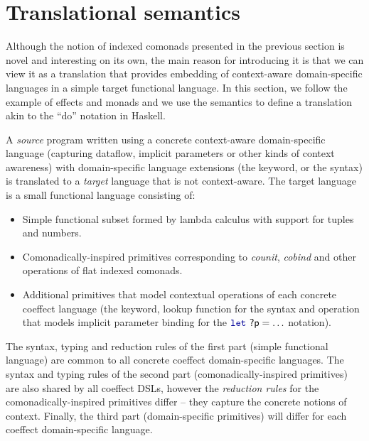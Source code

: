 
\section{Translational semantics}
\label{sec:semantics-translation}

Although the notion of indexed comonads presented in the previous section is novel and interesting
on its own, the main reason for introducing it is that we can view it as a translation that provides
embedding of context-aware domain-specific languages in a simple target functional language.
In this section, we follow the example of effects and monads and we use the semantics to define a
translation akin to the ``do'' notation in Haskell.

A \emph{source} program written using a concrete context-aware domain-specific
language (capturing dataflow, implicit parameters or other kinds of context awareness) with
domain-specific language extensions (the  keyword, or the  syntax)
is translated to a \emph{target} language that is not context-aware. The target language is
a small functional language consisting of:

\begin{itemize}
  \item Simple functional subset formed by lambda calculus with support for tuples and numbers.
  \item Comonadically-inspired primitives corresponding to \emph{counit}, \emph{cobind} and
    other operations of flat indexed comonads.
  \item Additional primitives that model contextual operations of each concrete coeffect language
    (the  keyword, lookup function for the  syntax and operation that models
     implicit parameter binding for the $\kvd{let}~\ident{?p}=\ldots$ notation).
\end{itemize}
%
The syntax, typing and reduction rules of the first part (simple functional language) are common to
all concrete coeffect domain-specific languages. The syntax and typing rules of the second part
(comonadically-inspired primitives) are also shared by all coeffect DSLs, however the \emph{reduction
rules} for the comonadically-inspired primitives differ -- they capture the concrete notions of
context. Finally, the third part (domain-specific primitives) will differ for each coeffect
domain-specific language.

